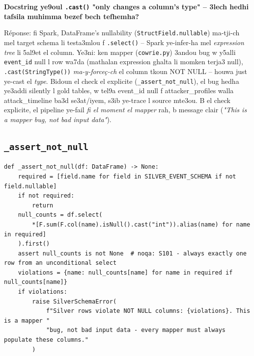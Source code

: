 \documentclass[11pt,a4paper]{report}
\DeclareRobustCommand{\code}[1]{\texttt{#1}}
\begin{document}
\begin{soual}
\textbf{Docstring ye9oul \code{.cast()} "only changes a column's type" --
3lech hedhi tafsila muhimma bezef bech tefhemha?}

Réponse: fi Spark, DataFrame's nullability (\code{StructField.nullable})
ma-tji-ch mel target schema li testa3mlou f \code{.select()} -- Spark
ye-infer-ha mel \emph{expression tree} li 5al9et el column. Ye3ni: ken
mapper (\code{cowrie.py}) 3andou bug w y5alli \code{event\_id} null l
row wa7da (mathalan expression ghalta li momken terja3 null), \code{.cast(StringType())}
\emph{ma-y-forceç-ch} el column tkoun NOT NULL -- houwa just ye-cast el
\emph{type}. Bidoun el check el explicite (\code{\_assert\_not\_null}),
el bug hedha ye3addi silently l gold tables, w tel9a event\_id null f
attacker\_profiles walla attack\_timeline ba3d se3at/iyem, s3ib ye-trace
l source mte3ou. B el check explicite, el pipeline ye-fail \emph{fi el
moment el mapper} rah, b message clair (\emph{"This is a mapper bug, not
bad input data"}).
\end{soual}

\subsection{\code{\_assert\_not\_null}}

\begin{lstlisting}[style=pystyle]
def _assert_not_null(df: DataFrame) -> None:
    required = [field.name for field in SILVER_EVENT_SCHEMA if not field.nullable]
    if not required:
        return
    null_counts = df.select(
        *[F.sum(F.col(name).isNull().cast("int")).alias(name) for name in required]
    ).first()
    assert null_counts is not None  # noqa: S101 - always exactly one row from an unconditional select
    violations = {name: null_counts[name] for name in required if null_counts[name]}
    if violations:
        raise SilverSchemaError(
            f"Silver rows violate NOT NULL columns: {violations}. This is a mapper "
            "bug, not bad input data - every mapper must always populate these columns."
        )
\end{lstlisting}
\end{document}
